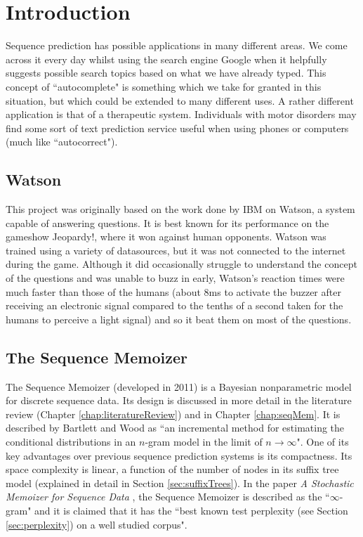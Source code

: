 \chapter{Introduction}


Sequence prediction has possible applications in many different areas. We come across it every day whilst using the search engine Google when it helpfully suggests possible search topics based on what we have already typed. This concept of ``autocomplete" is something which we take for granted in this situation, but which could be extended to many different uses. A rather different application is that of a therapeutic system. Individuals with motor disorders may find some sort of text prediction service useful when using phones or computers (much like ``autocorrect"). 

\section{Watson}

This project was originally based on the work done by IBM on Watson, a system capable of answering questions. It is best known for its performance on the gameshow Jeopardy!, where it won against human opponents. Watson was trained using a variety of datasources, but it was not connected to the internet during the game. Although it did occasionally struggle to understand the concept of the questions and was unable to buzz in early, Watson's reaction times were much faster than those of the humans (about 8ms to activate the buzzer after receiving an electronic signal compared to the tenths of a second taken for the humans to perceive a light signal) and so it beat them on most of the questions.

\section{The Sequence Memoizer}

The Sequence Memoizer (developed in 2011) is a Bayesian nonparametric model for discrete sequence data. Its design is discussed in more detail in the literature review (Chapter \ref{chap:literatureReview}) and in Chapter \ref{chap:seqMem}. It is described by Bartlett and Wood \cite{bartlett2011deplump} as ``an incremental method for estimating the conditional distributions in an $n$-gram model in the limit of $n\to\infty$". One of its key advantages over previous sequence prediction systems is its compactness. Its space complexity is linear, a function of the number of nodes in its suffix tree model (explained in detail in Section \ref{sec:suffixTrees}). In the paper \textit{A Stochastic Memoizer for Sequence Data} \cite{wood2009stochastic}, the Sequence Memoizer is described as the ``$\infty$-gram" and it is claimed that it has the ``best known test perplexity (see Section \ref{sec:perplexity}) on a well studied corpus". 

